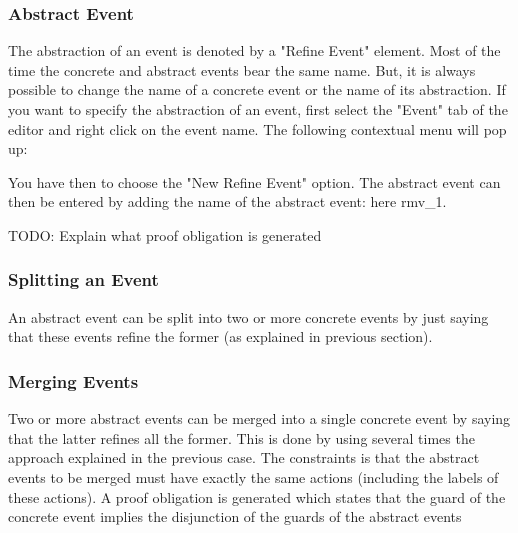 \subsubsection{Abstract Event}

The abstraction of an event is denoted by a "Refine Event" element. Most of the time the concrete and abstract events bear the same name. But, it is always possible to change the name of a concrete event or the name of its abstraction. If you want to specify the abstraction of an event, first select the "Event" tab of the editor and right click on the event name. The following contextual menu will pop up:


You have then to choose the "New Refine Event" option. The abstract event can then be entered by adding the name of the abstract event: here rmv\_1.


TODO: Explain what proof obligation is generated 

\subsubsection{Splitting an Event}

An abstract event can be split into two or more concrete events by just saying that these events refine the former (as explained in previous section).

\subsubsection{Merging Events}

Two or more abstract events can be merged into a single concrete event by saying that the latter refines all the former. This is done by using several times the approach explained in the previous case. The constraints is that the abstract events to be merged must have exactly the same actions (including the labels of these actions). A proof obligation is generated which states that the guard of the concrete event implies the disjunction of the guards of the abstract events

